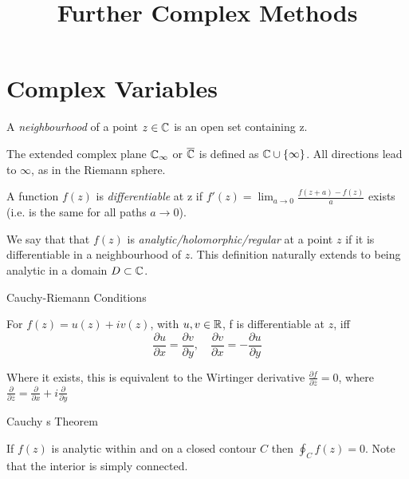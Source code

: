 \documentclass[a4paper]{article}
\title{Further Complex Methods}
\date{}
\author{}
\begin{document}
	
\maketitle

\section{Complex Variables}

\begin{defn}
	A \textit{neighbourhood} of a point $z\in \mathbb{C}$ is an open set containing z.
\end{defn}

\begin{defn}
	The extended complex plane $\mathbb{C}_{\infty}$ or $\overline{\mathbb{C}}$ is defined as $\mathbb{C} \cup \{\infty\}$. All directions lead to $\infty$, as in the Riemann sphere. 
\end{defn}

\begin{defn}
	A function $f(z)$ is \textit{differentiable} at z if $f'(z) = \lim_{a\to 0} \frac{f(z+a) - f(z)}{a}$ exists (i.e. is the same for all paths $a \to 0$).
\end{defn}

\begin{defn}
	We say that that $f(z)$ is \textit{analytic/holomorphic/regular} at a point $z$ if it is differentiable in a neighbourhood of $z$. This definition naturally extends to being analytic in a domain $D \subset \mathbb{C}$.
\end{defn}

\begin{prop} Cauchy-Riemann Conditions

For $f(z) = u(z) + i v(z)$, with $u, v \in \mathbb{R}$, f is differentiable at $z$, iff
 \[
\frac{\partial u}{\partial x} = \frac{\partial v}{\partial y}, \quad \frac{\partial v}{\partial x} = - \frac{\partial u}{\partial y}  
\]

Where it exists, this is equivalent to the Wirtinger derivative $\frac{\partial f}{\partial \overline{z}} = 0$, where $\frac{\partial }{\partial \overline{z}} = \frac{\partial }{\partial x} + i \frac{\partial }{\partial y} $ 

\end{prop}

\begin{thm} Cauchy s Theorem
	
	If $f(z)$ is analytic within and on a closed contour $C$ then $\oint_C f(z) = 0$.
	Note that the interior is simply connected.

\end{thm}
\end{document}

